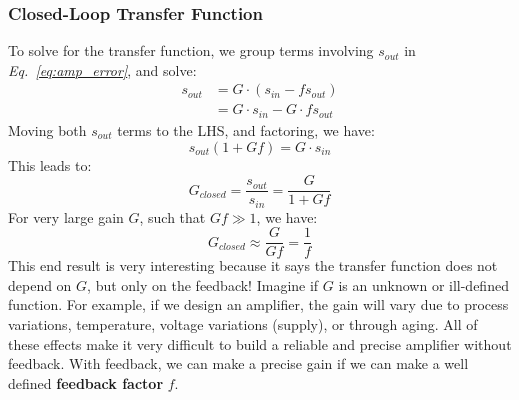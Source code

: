 \subsubsection{Closed-Loop Transfer Function}
To solve for the transfer function, we group terms involving $s_{out}$ in \emph{Eq.~\ref{eq:amp_error}}, and solve:
    \begin{align*}
        s_{out} &= G \cdot (s_{in} - f{s_{out}})\\
        &= G \cdot s_{in} - G \cdot f{s_{out}}
    \end{align*}
Moving both $s_{out}$ terms to the LHS, and factoring, we have:
    \begin{equation*}
        s_{out}(1 + Gf) = G \cdot s_{in}
    \end{equation*}
This leads to:
    \begin{equation}
        {G_{closed}} = \frac{{{s_{out}}}}{{{s_{in}}}} = \frac{G}{{1 + Gf}}
    \end{equation}
For very large gain $G$, such that $Gf \gg 1$, we have:
    \begin{equation}
        {G_{closed}} \approx \frac{G}{{Gf}} = \frac{1}{f}
        \label{eq:largegain}
    \end{equation}
This end result is very interesting because it says the transfer function does not depend on $G$, but only on the feedback!  Imagine if $G$ is an unknown or ill-defined function.  For example, if we design an amplifier, the gain will vary due to process variations, temperature, voltage variations (supply), or through aging.  All of these effects make it very difficult to build a reliable and precise amplifier without feedback.  With feedback, we can make a precise gain if we can make a well defined \textbf{feedback factor} $f$.
\newpage
